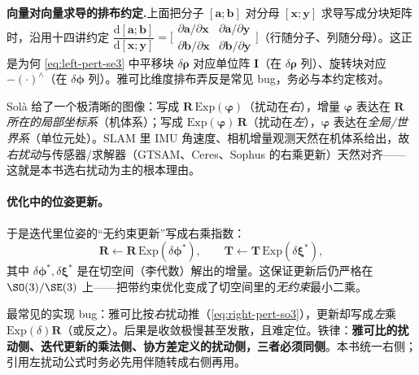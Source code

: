 \begin{note}
\textbf{向量对向量求导的排布约定.}\;上面把分子 $[\mathbf{a};\mathbf{b}]$ 对分母 $[\mathbf{x};\mathbf{y}]$ 求导写成分块矩阵时，沿用十四讲约定 $\dfrac{\mathrm{d}[\mathbf{a};\mathbf{b}]}{\mathrm{d}[\mathbf{x};\mathbf{y}]}=\big[\begin{smallmatrix}\partial\mathbf{a}/\partial\mathbf{x}&\partial\mathbf{a}/\partial\mathbf{y}\\\partial\mathbf{b}/\partial\mathbf{x}&\partial\mathbf{b}/\partial\mathbf{y}\end{smallmatrix}\big]$（行随分子、列随分母）。这正是为何 \cref{eq:left-pert-se3} 中平移块 $\delta\boldsymbol{\rho}$ 对应单位阵 $\mathbf{I}$（在 $\delta\boldsymbol{\rho}$ 列）、旋转块对应 $-(\cdot)^\wedge$（在 $\delta\boldsymbol{\phi}$ 列）。雅可比维度排布弄反是常见 bug，务必与本约定核对。
\end{note}

\begin{insight}[为什么右扰动 = 在“机体/局部系”下扰动]
Solà\cite{sola2018micro} 给了一个极清晰的图像：写成 $\mathbf{R}\,\mathrm{Exp}(\boldsymbol{\varphi})$（扰动在\emph{右}），增量 $\boldsymbol{\varphi}$ 表达在 $\mathbf{R}$ \emph{所在的局部坐标系}（机体系）；写成 $\mathrm{Exp}(\boldsymbol{\varphi})\,\mathbf{R}$（扰动在\emph{左}），$\boldsymbol{\varphi}$ 表达在\emph{全局/世界系}（单位元处）。SLAM 里 IMU 角速度、相机增量观测天然在机体系给出，故\emph{右扰动}与传感器/求解器（GTSAM、Ceres、Sophus 的右乘更新）天然对齐——这就是本书选右扰动为主的根本理由。
\end{insight}

\paragraph{优化中的位姿更新。}于是迭代里位姿的“无约束更新”写成右乘指数：
\begin{equation}
  \mathbf{R}\leftarrow\mathbf{R}\,\mathrm{Exp}(\delta\boldsymbol{\phi}^*),\qquad
  \mathbf{T}\leftarrow\mathbf{T}\,\mathrm{Exp}(\delta\boldsymbol{\xi}^*),
  \label{eq:right-update}
\end{equation}
其中 $\delta\boldsymbol{\phi}^*,\delta\boldsymbol{\xi}^*$ 是在切空间（李代数）解出的增量。这保证更新后仍严格在 $\SO(3)/\SE(3)$ 上——把带约束优化变成了切空间里的\emph{无约束}最小二乘。

\begin{pitfall}
最常见的实现 bug：雅可比按\emph{右}扰动推（\cref{eq:right-pert-so3}），更新却写成\emph{左}乘 $\mathrm{Exp}(\delta)\mathbf{R}$（或反之）。后果是收敛极慢甚至发散，且难定位。铁律：\textbf{雅可比的扰动侧、迭代更新的乘法侧、协方差定义的扰动侧，三者必须同侧}。本书统一右侧；引用左扰动公式时务必先用伴随转成右侧再用。
\end{pitfall}

